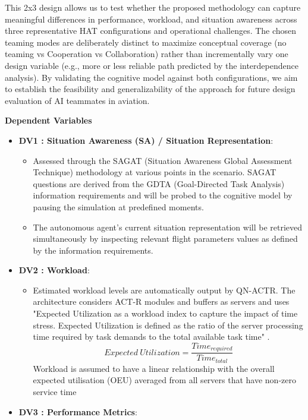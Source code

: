 \documentclass[12pt,a4paper]{article} %
\begin{document}
	This 2x3 design allows us to test whether the proposed methodology can capture meaningful differences in performance, workload, and situation awareness across three representative HAT configurations and operational challenges. The chosen teaming modes are deliberately distinct to maximize conceptual coverage (no teaming vs Cooperation vs Collaboration) rather than incrementally vary one design variable (e.g., more or less reliable path predicted by the interdependence analysis). By validating the cognitive model against both configurations, we aim to establish the feasibility and generalizability of the approach for future design evaluation of AI teammates in aviation.

	\textbf{Dependent Variables}
	\begin{itemize}
		\item \textbf{DV1 : Situation Awareness (SA) / Situation Representation}:
		\begin{itemize}
			\item Assessed through the SAGAT (Situation Awareness Global Assessment Technique) methodology at various points in the scenario.
			SAGAT questions are derived from the GDTA (Goal-Directed Task Analysis) information requirements and will be probed to the cognitive model by pausing the simulation at predefined moments.
			\item The autonomous agent's current situation representation will be retrieved simultaneously by inspecting relevant flight parameters values as defined by the information requirements.
		\end{itemize}
		\item \textbf{DV2 : Workload}:
		\begin{itemize}
			\item Estimated workload levels are automatically output by QN-ACTR. The architecture considers ACT-R modules and buffers as servers and uses "Expected Utilization as a workload index to capture the impact of time stress. Expected Utilization is defined as the ratio of the server processing time required by task demands to the total available task time" \parencite{cao_modelling_2015}.
			\begin{equation}
				Expected\ Utilization = \frac{Time_{required}}{Time_{total}} 
			\end{equation}
			Workload is assumed to have a linear relationship with the overall expected utilisation (OEU) averaged from all servers that have non-zero service time
		\end{itemize}
		\item \textbf{DV3 : Performance Metrics}:

\end{itemize}
\end{document}
